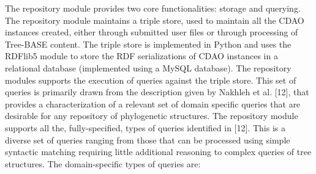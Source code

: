 \documentclass[10pt]{article}
\begin{document}
The repository module provides two core functionalities: storage and querying.
The repository module maintains a triple store, used to maintain all the CDAO
instances created, either through submitted user files or through processing of
Tree-BASE content. The triple store is implemented in Python and uses the
RDFlib5 module to store the RDF serializations of CDAO instances in a
relational database (implemented using a MySQL database).  The repository
modules supports the execution of queries against the triple store. This set of
queries is primarily drawn from the description given by Nakhleh et al. [12],
that provides a characterization of a relevant set of domain specific queries
that are desirable for any repository of phylogenetic structures. The
repository module supports all the, fully-specified, types of queries
identified in [12]. This is a diverse set of queries ranging from those that
can be processed using simple syntactic matching requiring little additional
reasoning to complex queries of tree structures. The domain-specific types of
queries are:
\end{document}
